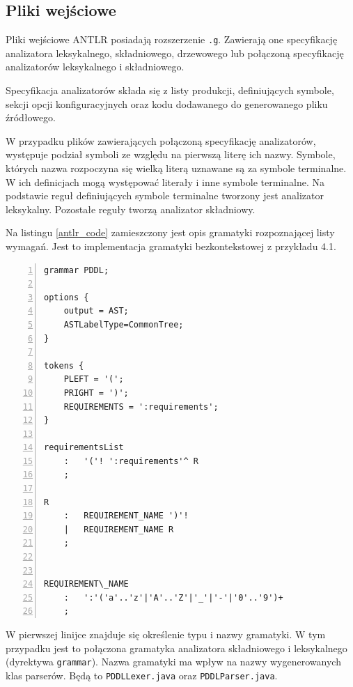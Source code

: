 \subsection{Pliki wejściowe}

Pliki wejściowe ANTLR posiadają rozszerzenie \texttt{.g}. Zawierają one specyfikację
analizatora leksykalnego, składniowego, drzewowego lub połączoną specyfikację
analizatorów leksykalnego i składniowego. 

Specyfikacja analizatorów składa się z listy produkcji, definiujących symbole,
 sekcji opcji konfiguracyjnych oraz kodu dodawanego do generowanego
pliku źródłowego.

W przypadku plików zawierających połączoną specyfikację analizatorów, występuje
podział symboli ze względu na pierwszą literę ich nazwy.
 Symbole, których nazwa rozpoczyna się wielką literą uznawane są
za symbole terminalne. W ich definicjach mogą występować literały i inne
symbole terminalne. Na podstawie reguł definiujących symbole terminalne
tworzony jest analizator leksykalny. Pozostałe reguły tworzą analizator
składniowy.


Na listingu \ref{antlr_code} zamieszczony jest opis gramatyki rozpoznającej
listy wymagań. Jest to implementacja gramatyki bezkontekstowej z przykładu
4.1.

\setcounter{lstlisting}{1}
\begin{Code}[h!]
\begin{lstlisting}[label=antlr_code, caption=Gramatyka ANTLR opisująca listę wymagań, numbers=left, frame=single]
grammar PDDL;

options {
	output = AST;
	ASTLabelType=CommonTree;
}

tokens {
	PLEFT = '(';
	PRIGHT = ')';
	REQUIREMENTS = ':requirements';
}

requirementsList
	:	'('! ':requirements'^ R
	;

R
	:	REQUIREMENT_NAME ')'!
	|	REQUIREMENT_NAME R
	;


REQUIREMENT\_NAME
	:	':'('a'..'z'|'A'..'Z'|'_'|'-'|'0'..'9')+
    ;

\end{lstlisting}
\end{Code}

W pierwszej linijce znajduje się określenie typu i nazwy
gramatyki. W tym przypadku jest to połączona gramatyka analizatora
składniowego i leksykalnego (dyrektywa \texttt{grammar}). Nazwa gramatyki
ma wpływ na nazwy wygenerowanych klas parserów. Będą to 
\texttt{PDDLLexer.java} oraz \texttt{PDDLParser.java}.

